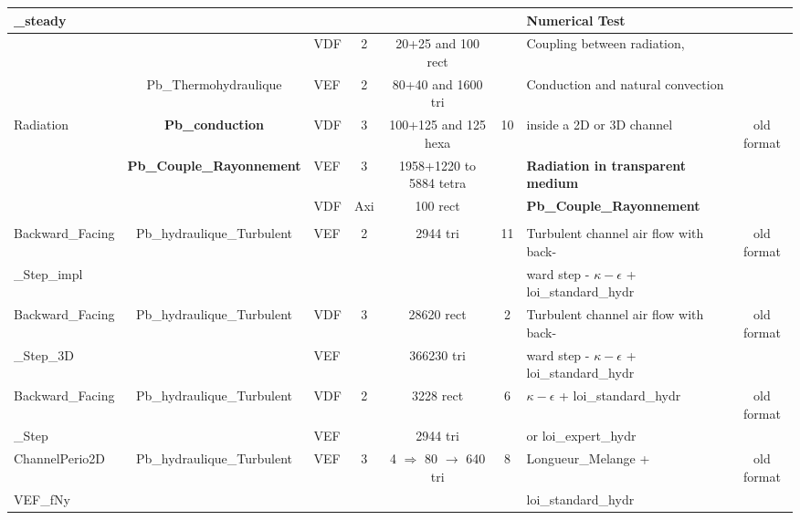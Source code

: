 \begin{table}[H]
\begin{centering}
\begin{tabular}{lclccclc}
\rowcolor{ForestGreen!10} \_steady & & & & & & \textbf{Numerical Test} & \\ \hline
\rowcolor{ForestGreen!10}& & VDF & 2 & 20+25 and 100 rect & & Coupling between radiation, & \\
\rowcolor{ForestGreen!10} & Pb\_Thermohydraulique & VEF & 2 & 80+40 and 1600 tri & & Conduction and natural convection  & \\ 
\rowcolor{ForestGreen!10}Radiation & \textbf{Pb\_conduction} & VDF & 3 & 100+125 and 125 hexa & 10 & inside a 2D or 3D channel & old format \\
\rowcolor{ForestGreen!10} & \textbf{Pb\_Couple\_Rayonnement} & VEF & 3 & 1958+1220 to 5884 tetra & & \textbf{Radiation in transparent medium} & \\ 
\rowcolor{ForestGreen!10} & & VDF & Axi & 100 rect & & \textbf{Pb\_Couple\_Rayonnement} & \\ \hline
\rowcolor{SkyBlue} \multicolumn{8}{c}{\textbf{Turbulent Flow}} \\
\hline
\rowcolor{SkyBlue!10}Backward\_Facing & Pb\_hydraulique\_Turbulent & VEF & 2 & 2944 tri & 11 & Turbulent channel air flow with back- & old format \\ 
\rowcolor{SkyBlue!10}\_Step\_impl & & & & & & ward step - $\kappa-\epsilon$ + loi\_standard\_hydr &  \\ \hline
\rowcolor{SkyBlue!10}Backward\_Facing & Pb\_hydraulique\_Turbulent & VDF & 3 & 28620 rect & 2 & Turbulent channel air flow with back- & old format \\ 
\rowcolor{SkyBlue!10}\_Step\_3D & & VEF & & 366230 tri & & ward step - $\kappa-\epsilon$ + loi\_standard\_hydr & \\ \hline
\rowcolor{SkyBlue!10}Backward\_Facing & Pb\_hydraulique\_Turbulent & VDF & 2 & 3228 rect & 6 & $\kappa-\epsilon$ + loi\_standard\_hydr  & old format \\ 
\rowcolor{SkyBlue!10}\_Step & & VEF & & 2944 tri & & or loi\_expert\_hydr & \\ \hline
\rowcolor{SkyBlue!10}ChannelPerio2D & Pb\_hydraulique\_Turbulent & VEF & 3 & 4 $\Rightarrow$ 80 $\to$ 640 tri & 8 & Longueur\_Melange +  & old format \\ 
\rowcolor{SkyBlue!10}VEF\_fNy & & & & & & loi\_standard\_hydr &  \\ \hline
	\end{tabular}
\end{centering}
\end{table}

\newpage

